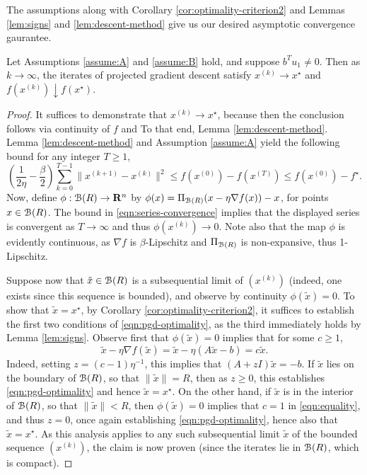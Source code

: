 \documentclass[11pt]{article}
\newcommand{\proj}{\ensuremath{\Pi_{\B(R)}}}
\begin{document}
The assumptions along with Corollary \ref{cor:optimality-criterion2}
and Lemmas \ref{lem:signs} and \ref{lem:descent-method}
give us our desired asymptotic convergence gaurantee.
\begin{prop}\label{prop:pgd-convergence}
Let Assumptions \ref{assume:A} and 
\ref{assume:B} 
hold, and suppose $b^Tu_1 \neq 0$.
Then as $k \to \infty$, the iterates
of projected gradient descent satisfy $x^{(k)} \to x^\star$
and $f(x^{(k)}) \downarrow f(x^\star)$.
\end{prop}
\begin{proof}
  It suffices to demonstrate that $x^{(k)} \to x^\star$, because then
  the conclusion follows via continuity of $f$ and
  To that end, Lemma \ref{lem:descent-method}.
Lemma \ref{lem:descent-method} and 
Assumption \ref{assume:A} yield the following bound for any integer $T \geq 1$, 
\begin{equation}
\label{eqn:series-convergence}
\left(\frac{1}{2\eta} - \frac{\beta}{2} \right)\sum_{k=0}^{T - 1} 
\|x^{(k + 1)} - x^{(k)}\|^2 
\leq f(x^{(0)}) - f(x^{(T)}) 
\leq f(x^{(0)}) - f^\star. 
\end{equation}
Now, define $\phi: \mathcal{B}(R) \to \mathbf{R}^n$ 
by $\phi(x) = \proj(x - \eta \nabla f(x)) - x$, for points $x \in \mathcal{B}(R)$. 
The bound in \eqref{eqn:series-convergence} implies that the displayed series is convergent as $T \to \infty$ and thus 
$\phi(x^{(k)}) \to 0$.
Note also that the map $\phi$ is evidently continuous, as $\nabla f$ is $\beta$-Lipschitz and $\proj$ is 
non-expansive, thus 1-Lipschitz. 

Suppose now that $\tilde x \in \mathcal{B}(R)$ is a subsequential 
limit of $(x^{(k)})$ (indeed, one exists since this sequence is bounded), and observe by
continuity $\phi(\tilde x) = 0$. To show that $\tilde x = x^\star$, by Corollary \ref{cor:optimality-criterion2}, it
suffices to establish the first two conditions of \eqref{eqn:pgd-optimality}, as the third immediately holds by
Lemma \ref{lem:signs}. Observe first that $\phi(\tilde x) = 0$ implies that for some $c \geq 1$,
\begin{equation}\label{eqn:equality}
\tilde x - \eta \nabla f(\tilde x) = \tilde x - \eta (A \tilde x - b) = c \tilde x.
\end{equation}
Indeed, setting $z = (c - 1)\eta^{-1}$, this implies that $(A + zI)\tilde x = -b$. 
If $\tilde x$ lies on the boundary of $\mathcal{B}(R)$, so that $\|\tilde x\| = R$, then as $z \geq 0$,
this establishes \eqref{eqn:pgd-optimality} and hence $\tilde x = x^\star$. On the other hand,
if $\tilde x$ is in the interior of $\mathcal{B}(R)$, so that $\|\tilde x\| < R$, then
$\phi(\tilde x) = 0$ implies that $c = 1$ in \eqref{eqn:equality}, and thus $z = 0$, once again
establishing \eqref{eqn:pgd-optimality}, hence also that $\tilde x = x^\star$. As this analysis applies
to any such subsequential limit $\tilde x$ of the bounded sequence $(x^{(k)})$, the claim is now proven (since the iterates
lie in $\mathcal{B}(R)$, which is compact).
\end{proof}
\end{document}

